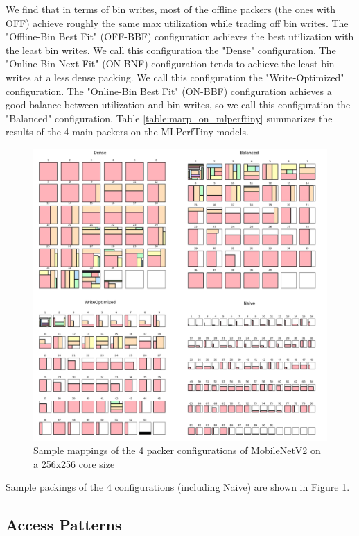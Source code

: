 We find that in terms of bin writes, most of the offline packers (the ones with OFF) achieve roughly the same max utilization while trading off bin writes. The "Offline-Bin Best Fit" (OFF-BBF) configuration achieves the best utilization with the least bin writes. We call this configuration the "Dense" configuration. The "Online-Bin Next Fit" (ON-BNF) configuration tends to achieve the least bin writes at a less dense packing. We call this configuration the "Write-Optimized" configuration. The "Online-Bin Best Fit" (ON-BBF) configuration achieves a good balance between utilization and bin writes, so we call this configuration the "Balanced" configuration. Table \ref{table:marp_on_mlperftiny} summarizes the results of the 4 main packers on the MLPerfTiny models.

\begin{figure}[htbp]
    \centering
    \includegraphics[width=\textwidth]{images/marp/mbv2_sample.png}
    \caption{Sample mappings of the 4 packer configurations of MobileNetV2 on a 256x256 core size}
    \label{fig:mbv2_sample}
\end{figure}

Sample packings of the 4 configurations (including Naive) are shown in Figure \ref{fig:mbv2_sample}.

\subsection{Access Patterns}

